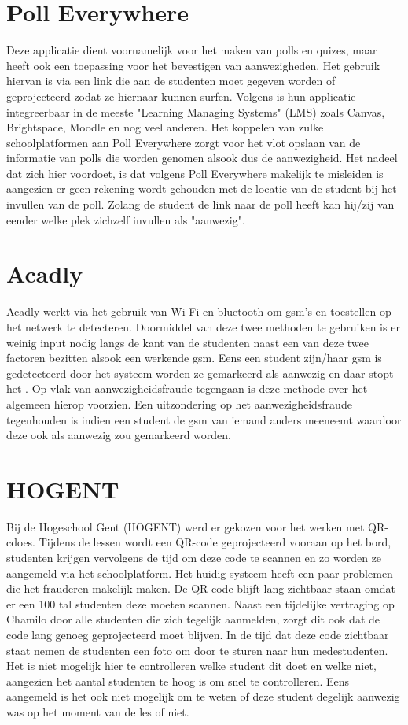 \section{Poll Everywhere}
Deze applicatie dient voornamelijk voor het maken van polls en quizes, maar heeft ook een toepassing voor het bevestigen van aanwezigheden. Het gebruik hiervan is via een link die aan de studenten moet gegeven worden of geprojecteerd zodat ze hiernaar kunnen surfen. Volgens \textcite{PollEverywhere2026} is hun applicatie integreerbaar in de meeste "Learning Managing Systems" (LMS) zoals Canvas, Brightspace, Moodle en nog veel anderen. Het koppelen van zulke schoolplatformen aan Poll Everywhere zorgt voor het vlot opslaan van de informatie van polls die worden genomen alsook dus de aanwezigheid. Het nadeel dat zich hier voordoet, is dat volgens \textcite{UniColumbia2026} Poll Everywhere makelijk te misleiden is aangezien er geen rekening wordt gehouden met de locatie van de student bij het invullen van de poll. Zolang de student de link naar de poll heeft kan hij/zij van eender welke plek zichzelf invullen als "aanwezig". 

\section{Acadly}
Acadly werkt via het gebruik  van Wi-Fi en bluetooth om gsm's en toestellen op het netwerk te detecteren. Doormiddel van deze twee methoden te gebruiken is er weinig input nodig langs de kant van de studenten naast een van deze twee factoren bezitten alsook een werkende gsm. Eens een student zijn/haar gsm is gedetecteerd door het systeem worden ze gemarkeerd als aanwezig en daar stopt het \autocite{Acadly2022}. Op vlak van aanwezigheidsfraude tegengaan is deze methode over het algemeen hierop voorzien. Een uitzondering op het aanwezigheidsfraude tegenhouden is indien een student de gsm van iemand anders meeneemt waardoor deze ook als aanwezig zou gemarkeerd worden.

\section{HOGENT}
Bij de Hogeschool Gent (HOGENT) werd er gekozen voor het werken met QR-cdoes. Tijdens de lessen wordt een QR-code geprojecteerd vooraan op het bord, studenten krijgen vervolgens de tijd om deze code te scannen en zo worden ze aangemeld via het schoolplatform. Het huidig systeem heeft een paar problemen die het frauderen makelijk maken.  De QR-code blijft lang zichtbaar staan omdat er een 100 tal studenten deze moeten scannen. Naast een tijdelijke vertraging op Chamilo door alle studenten die zich tegelijk aanmelden, zorgt dit ook dat de code lang genoeg geprojecteerd moet blijven. In de tijd dat deze code zichtbaar staat nemen de studenten een foto om door te sturen naar hun medestudenten. Het is niet mogelijk hier te controlleren welke student dit doet en welke niet, aangezien het aantal studenten te hoog is om snel te controlleren. Eens aangemeld is het ook niet mogelijk om te weten of deze student degelijk aanwezig was op het moment van de les of niet.





